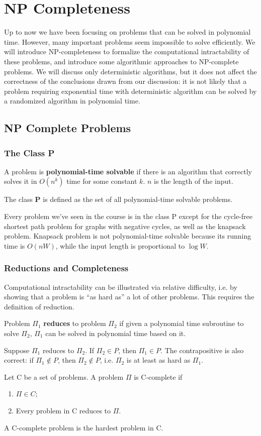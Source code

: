 \ifx\PREAMBLE\undefined


\fi
\chapter{NP Completeness}
Up to now we have been focusing on problems that can be solved in polynomial time. However, many important problems seem impossible to solve efficiently.  We will introduce NP-completeness to formalize the computational intractability of these problems, and introduce some algorithmic approaches to NP-complete problems. We will discuss only deterministic algorithms, but it does not affect the correctness of the conclusions drawn from our discussion: it is not likely that a problem requiring exponential time with deterministic algorithm can be solved by a randomized algorithm in polynomial time.
\section{NP Complete Problems}
\subsection{The Class P}
\begin{definition}
A problem is \textbf{polynomial-time solvable} if there is an algorithm that correctly solves it in $O(n^k)$ time for some constant $k$. $n$ is the length of the input.
\end{definition}
\begin{definition}
The class \textbf{P} is defined as the set of all polynomial-time solvable problems. 
\end{definition}
Every problem we've seen in the course is in the class P except for the cycle-free shortest path problem for graphs with negative cycles, as well as the knapsack problem. Knapsack problem is not polynomial-time solvable because its running time is $O(nW)$, while the input length is proportional to $\log W$. 
\subsection{Reductions and Completeness}
Computational intractability can be illustrated via relative difficulty, i.e. by showing that a problem is ``as hard as'' a lot of other problems. This requires the definition of reduction. 
\begin{definition}
Problem $\Pi_1$ \textbf{reduces} to problem $\Pi_2$ if given a polynomial time subroutine to solve $\Pi_2$, $\Pi_1$ can be solved in polynomial time based on it.
\end{definition}
Suppose $\Pi_1$ reduces to $\Pi_2$. If $\Pi_2\in P$, then $\Pi_1\in P$. The contrapositive is also correct: if $\Pi_1\notin P$, then $\Pi_2\notin P$, i.e. $\Pi_2$ is at least as hard as $\Pi_1$. 
\begin{definition}
Let C be a set of problems. A problem $\Pi$ is C-complete if 
\begin{enumerate}
\item $\Pi\in C$;
\item Every problem in C reduces to $\Pi$. 
\end{enumerate}
\end{definition}
A C-complete problem is the hardest problem in C.

